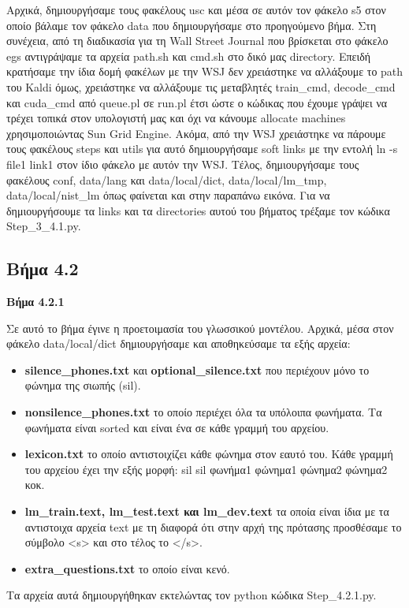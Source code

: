 \documentclass[12pt]{article}
\begin{document}
Αρχικά, δημιουργήσαμε τους φακέλους usc και μέσα σε αυτόν τον φάκελο s5 στον οποίο βάλαμε τον φάκελο data που δημιουργήσαμε στο προηγούμενο βήμα.
Στη συνέχεια, από τη διαδικασία για τη Wall Street Journal που βρίσκεται στο φάκελο egs αντιγράψαμε  τα αρχεία path.sh και cmd.sh στο δικό μας directory. Επειδή κρατήσαμε την ίδια δομή φακέλων με την WSJ δεν χρειάστηκε να αλλάξουμε το path του Kaldi όμως, χρειάστηκε να αλλάξουμε τις μεταβλητές train\_cmd, decode\_cmd και cuda\_cmd από queue.pl σε run.pl έτσι ώστε ο κώδικας που έχουμε γράψει να τρέχει τοπικά στον υπολογιστή μας και όχι να κάνουμε allocate machines χρησιμοποιώντας Sun Grid Engine.
Ακόμα, από την WSJ χρειάστηκε να πάρουμε τους φακέλους steps και utils για αυτό δημιουργήσαμε soft links με την εντολή ln -s file1 link1 στον ίδιο φάκελο με αυτόν την WSJ.
Τέλος, δημιουργήσαμε τους φακέλους conf, data/lang και data/local/dict, data/local/lm\_tmp, data/local/nist\_lm όπως φαίνεται και στην παραπάνω εικόνα.
Για να δημιουργήσουμε τα links και τα directories αυτού του βήματος τρέξαμε τον κώδικα Step\_3\_4.1.py.

\subsection*{Βήμα 4.2}
\textbf{Βήμα 4.2.1}

Σε αυτό το βήμα έγινε η προετοιμασία του γλωσσικού μοντέλου. 
Αρχικά, μέσα στον φάκελο data/local/dict δημιουργήσαμε και αποθηκεύσαμε τα εξής αρχεία:
\begin{itemize}
    \item \textbf{silence\_phones.txt} και \textbf{optional\_silence.txt} που περιέχουν μόνο το φώνημα της σιωπής (sil).
    \item \textbf{nonsilence\_phones.txt} το οποίο περιέχει όλα τα υπόλοιπα φωνήματα. Τα φωνήματα είναι sorted και είναι ένα σε κάθε γραμμή του αρχείου.
    \item \textbf{lexicon.txt} το οποίο αντιστοιχίζει κάθε φώνημα στον εαυτό του. Κάθε γραμμή του αρχείου έχει την εξής μορφή: sil sil φωνήμα1 φώνημα1 φώνημα2 φώνημα2 κοκ.
    \item \textbf{lm\_train.text, lm\_test.text και lm\_dev.text} τα οποία είναι ίδια με τα αντιστοιχα αρχεία text με τη διαφορά ότι στην αρχή της πρότασης προσθέσαμε το σύμβολο <s> και στο τέλος το </s>.
    \item \textbf{extra\_questions.txt} το οποίο είναι κενό.
\end{itemize}
Τα αρχεία αυτά δημιουργήθηκαν εκτελώντας τον python κώδικα Step\_4.2.1.py.
\end{document}
